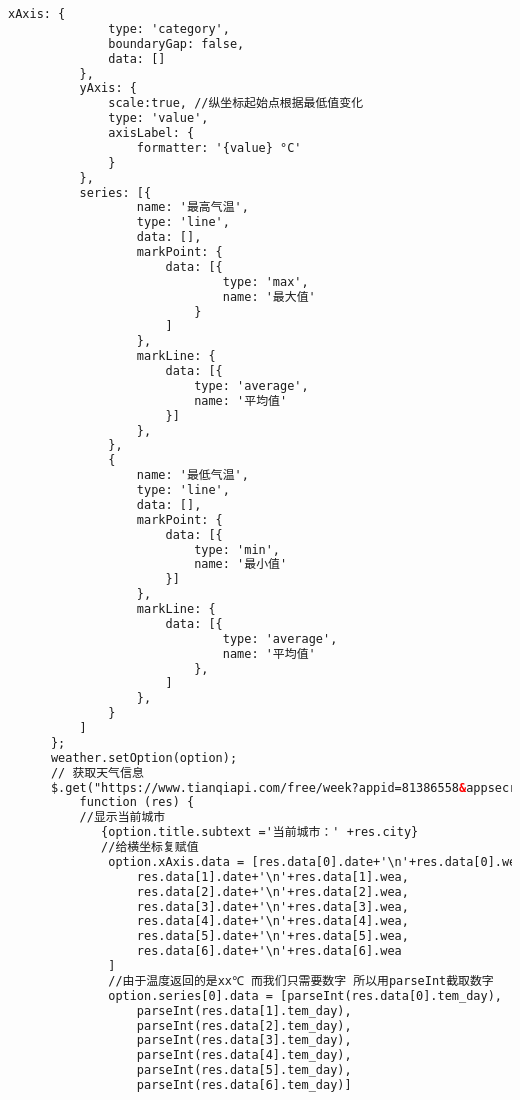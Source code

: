 \documentclass[12pt,AutoFakeBold]{article}
\begin{document}
\begin{appendices}
\begin{lstlisting}[language=html]
          xAxis: {
              type: 'category',
              boundaryGap: false,
              data: []
          },
          yAxis: {
              scale:true, //纵坐标起始点根据最低值变化
              type: 'value',
              axisLabel: {
                  formatter: '{value} °C'
              }
          },
          series: [{
                  name: '最高气温',
                  type: 'line',
                  data: [],
                  markPoint: {
                      data: [{
                              type: 'max',
                              name: '最大值'
                          }
                      ]
                  },
                  markLine: {
                      data: [{
                          type: 'average',
                          name: '平均值'
                      }]
                  },
              },
              {
                  name: '最低气温',
                  type: 'line',
                  data: [],
                  markPoint: {
                      data: [{
                          type: 'min',
                          name: '最小值'
                      }]
                  },
                  markLine: {
                      data: [{
                              type: 'average',
                              name: '平均值'
                          },
                      ]
                  },
              }
          ]
      };
      weather.setOption(option);
      // 获取天气信息
      $.get("https://www.tianqiapi.com/free/week?appid=81386558&appsecret=52jN6BzG&cityid=CN101110101",
          function (res) {
          //显示当前城市
             {option.title.subtext ='当前城市：' +res.city}
             //给横坐标复赋值
              option.xAxis.data = [res.data[0].date+'\n'+res.data[0].wea,
                  res.data[1].date+'\n'+res.data[1].wea,
                  res.data[2].date+'\n'+res.data[2].wea,
                  res.data[3].date+'\n'+res.data[3].wea,
                  res.data[4].date+'\n'+res.data[4].wea,
                  res.data[5].date+'\n'+res.data[5].wea,
                  res.data[6].date+'\n'+res.data[6].wea
              ]
              //由于温度返回的是xx℃ 而我们只需要数字 所以用parseInt截取数字
              option.series[0].data = [parseInt(res.data[0].tem_day),
                  parseInt(res.data[1].tem_day),
                  parseInt(res.data[2].tem_day),
                  parseInt(res.data[3].tem_day),
                  parseInt(res.data[4].tem_day),
                  parseInt(res.data[5].tem_day),
                  parseInt(res.data[6].tem_day)]

\end{lstlisting}
\end{appendices}
\end{document}
